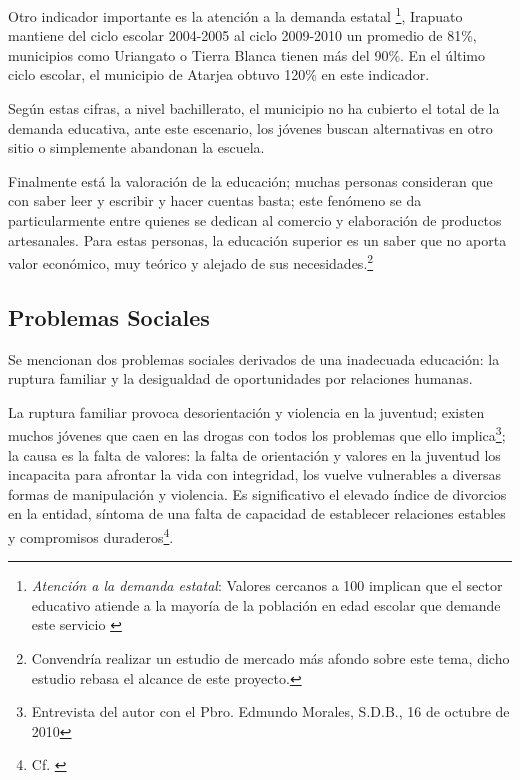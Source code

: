 





Otro indicador importante es la atención a la demanda estatal \footnote{\emph{Atención a la demanda estatal}: Valores cercanos a 100 implican que el sector educativo atiende a la mayoría de la población en edad escolar que demande este servicio \citep{Seg2010}}, Irapuato mantiene del ciclo escolar 2004-2005 al ciclo 2009-2010 un promedio de 81\%, municipios como Uriangato o Tierra Blanca tienen más del 90\%. En el último ciclo escolar, el municipio de Atarjea obtuvo 120\% en este indicador.

Según estas cifras, a nivel bachillerato, el municipio no ha cubierto el total de la demanda educativa, ante este escenario, los jóvenes buscan alternativas en otro sitio o simplemente abandonan la escuela.

Finalmente está la valoración de la educación; muchas personas consideran que con saber leer y escribir y hacer cuentas basta; este fenómeno se da particularmente entre quienes se dedican al comercio y elaboración de productos artesanales. Para estas personas, la educación superior es un saber que no aporta valor económico, muy teórico y alejado de sus necesidades.\footnote{Convendría realizar un estudio de mercado más afondo sobre este tema, dicho estudio rebasa el alcance de este proyecto.}



\subsection{Problemas Sociales}

Se mencionan dos problemas sociales derivados de una inadecuada educación: la ruptura familiar y la desigualdad de oportunidades por relaciones humanas.

La ruptura familiar provoca desorientación y violencia en la juventud; existen muchos j\'ovenes que caen en las drogas con todos los problemas que ello implica\footnote{Entrevista del autor con el Pbro. Edmundo Morales, S.D.B., 16 de octubre de 2010}; la causa es la falta de valores: la falta de orientación y valores en la juventud los incapacita para afrontar la vida con integridad, los vuelve vulnerables a diversas formas de manipulación y violencia. Es significativo el elevado índice de divorcios en la entidad, síntoma de una falta de capacidad de establecer relaciones estables y compromisos duraderos\footnote{Cf. \citep{Morales09}}.

